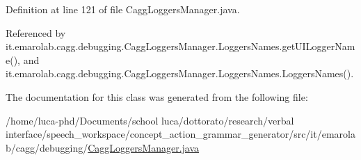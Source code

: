 Definition at line 121 of file Cagg\-Loggers\-Manager.\-java.



Referenced by it.\-emarolab.\-cagg.\-debugging.\-Cagg\-Loggers\-Manager.\-Loggers\-Names.\-get\-U\-I\-Logger\-Name(), and it.\-emarolab.\-cagg.\-debugging.\-Cagg\-Loggers\-Manager.\-Loggers\-Names.\-Loggers\-Names().



The documentation for this class was generated from the following file\-:\begin{DoxyCompactItemize}
\item 
/home/luca-\/phd/\-Documents/school luca/dottorato/research/verbal interface/speech\-\_\-workspace/concept\-\_\-action\-\_\-grammar\-\_\-generator/src/it/emarolab/cagg/debugging/\hyperlink{CaggLoggersManager_8java}{Cagg\-Loggers\-Manager.\-java}\end{DoxyCompactItemize}
